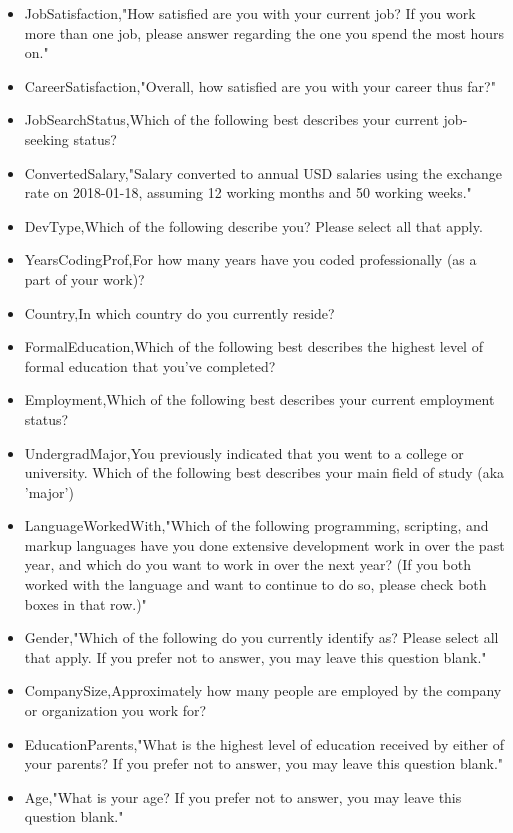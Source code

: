 \begin{appendices}
    \begin{itemize}
        \item JobSatisfaction,"How satisfied are you with your current job? If you work more than one job, please answer regarding the one you spend the most hours on."
        \item CareerSatisfaction,"Overall, how satisfied are you with your career thus far?"
        \item JobSearchStatus,Which of the following best describes your current job-seeking status?
        \item ConvertedSalary,"Salary converted to annual USD salaries using the exchange rate on 2018-01-18, assuming 12 working months and 50 working weeks."
        \item DevType,Which of the following describe you? Please select all that apply.
        \item YearsCodingProf,For how many years have you coded professionally (as a part of your work)?
        \item Country,In which country do you currently reside?
        \item FormalEducation,Which of the following best describes the highest level of formal education that you’ve completed?
        \item Employment,Which of the following best describes your current employment status?
        \item UndergradMajor,You previously indicated that you went to a college or university. Which of the following best describes your main field of study (aka 'major')
        \item LanguageWorkedWith,"Which of the following programming, scripting, and markup languages have you done extensive development work in over the past year, and which do you want to work in over the next year?  (If you both worked with the language and want to continue to do so, please check both boxes in that row.)"
        \item Gender,"Which of the following do you currently identify as? Please select all that apply. If you prefer not to answer, you may leave this question blank."
        \item CompanySize,Approximately how many people are employed by the company or organization you work for?
        \item EducationParents,"What is the highest level of education received by either of your parents? If you prefer not to answer, you may leave this question blank."
        \item Age,"What is your age? If you prefer not to answer, you may leave this question blank."

\end{itemize}
\end{appendices}
